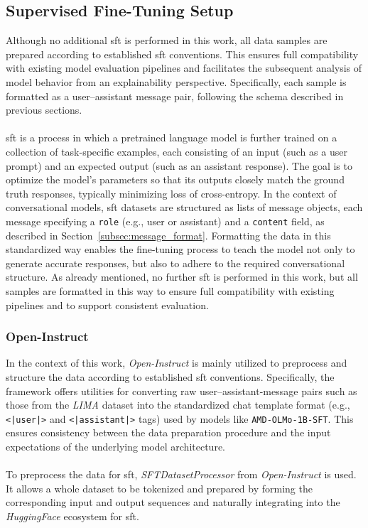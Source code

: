 \subsection{Supervised Fine-Tuning Setup}
Although no additional \acrfull{sft} is performed in this work, all data samples are prepared according to established \acrshort{sft} conventions. This ensures full compatibility with existing model evaluation pipelines and facilitates the subsequent analysis of model behavior from an explainability perspective. Specifically, each sample is formatted as a user–assistant message pair, following the schema described in previous sections.
\\\\
\acrfull{sft} is a process in which a pretrained language model is further trained on a collection of task-specific examples, each consisting of an input (such as a user prompt) and an expected output (such as an assistant response). The goal is to optimize the model’s parameters so that its outputs closely match the ground truth responses, typically minimizing loss of cross-entropy. In the context of conversational models, \acrshort{sft} datasets are structured as lists of message objects, each message specifying a \texttt{role} (e.g., user or assistant) and a \texttt{content} field, as described in Section~\ref{subsec:message_format}. Formatting the data in this standardized way enables the fine-tuning process to teach the model not only to generate accurate responses, but also to adhere to the required conversational structure. As already mentioned, no further \acrshort{sft} is performed in this work, but all samples are formatted in this way to ensure full compatibility with existing pipelines and to support consistent evaluation.

\subsubsection{Open-Instruct}
In the context of this work, \emph{Open-Instruct} is mainly utilized to preprocess and structure the data according to established \acrshort{sft} conventions. Specifically, the framework offers utilities for converting raw user–assistant-message pairs such as those from the \emph{LIMA} dataset into the standardized chat template format (e.g., \texttt{<|user|>} and \texttt{<|assistant|>} tags) used by models like \texttt{AMD-OLMo-1B-SFT}. This ensures consistency between the data preparation procedure and the input expectations of the underlying model architecture.
\\\\
To preprocess the data for \acrfull{sft}, \emph{SFTDatasetProcessor} from \emph{Open-Instruct} is used. It allows a whole dataset to be tokenized and prepared by forming the corresponding input and output sequences and naturally integrating into the \emph{HuggingFace} ecosystem for \acrshort{sft}.

